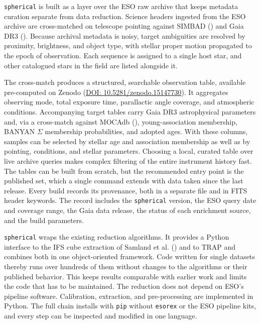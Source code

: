\documentclass[
]{article}
\begin{document}
\texttt{spherical} is built as a layer over the ESO raw archive that
keeps metadata curation separate from data reduction. Science headers
ingested from the ESO archive are cross-matched on telescope pointing
against SIMBAD () and
Gaia DR3 ().
Because archival metadata is noisy, target ambiguities are resolved by
proximity, brightness, and object type, with stellar proper motion
propagated to the epoch of observation. Each sequence is assigned to a
single host star, and other catalogued stars in the field are listed
alongside it.

The cross-match produces a structured, searchable observation table,
available pre-computed on Zenodo
(\href{https://doi.org/10.5281/zenodo.15147730}{DOI:
10.5281/zenodo.15147730}). It aggregates observing mode, total exposure
time, parallactic angle coverage, and atmospheric conditions.
Accompanying target tables carry Gaia DR3 astrophysical parameters and,
via a cross-match against MOCAdb (), young-association membership, BANYAN \(\Sigma\) membership
probabilities, and adopted ages. With these columns, samples can be
selected by stellar age and association membership as well as by
pointing, conditions, and stellar parameters. Choosing a local, curated
table over live archive queries makes complex filtering of the entire
instrument history fast. The tables can be built from scratch, but the
recommended entry point is the published set, which a single command
extends with data taken since the last release. Every build records its
provenance, both in a separate file and in FITS header keywords. The
record includes the \texttt{spherical} version, the ESO query date and
coverage range, the Gaia data release, the status of each enrichment
source, and the build parameters.

\texttt{spherical} wraps the existing reduction algorithms. It provides
a Python interface to the IFS cube extraction of Samland et al.
() and to TRAP and combines both in one
object-oriented framework. Code written for single datasets thereby runs
over hundreds of them without changes to the algorithms or their
published behavior. This keeps results comparable with earlier work and
limits the code that has to be maintained. The reduction does not depend
on ESO's pipeline software. Calibration, extraction, and pre-processing
are implemented in Python. The full chain installs with \texttt{pip}
without \texttt{esorex} or the ESO pipeline kits, and every step can be
inspected and modified in one language.
\end{document}
